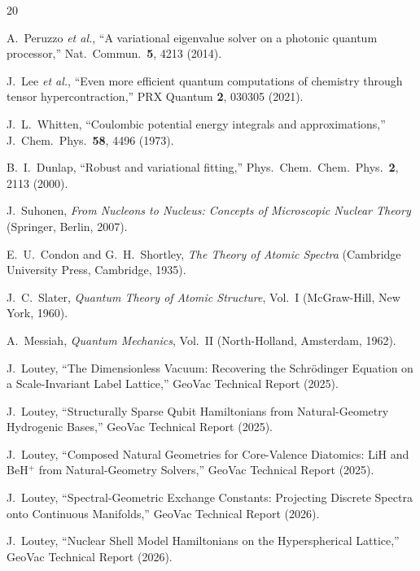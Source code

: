\documentclass[twocolumn,pra,amsmath,amssymb,superscriptaddress]{revtex4-2}
\begin{document}
\begin{thebibliography}{20}

A.~Peruzzo \textit{et al.},
``A variational eigenvalue solver on a photonic quantum processor,''
Nat.\ Commun.\ \textbf{5}, 4213 (2014).

J.~Lee \textit{et al.},
``Even more efficient quantum computations of chemistry through
tensor hypercontraction,''
PRX Quantum \textbf{2}, 030305 (2021).

J.~L.~Whitten,
``Coulombic potential energy integrals and approximations,''
J.\ Chem.\ Phys.\ \textbf{58}, 4496 (1973).

B.~I.~Dunlap,
``Robust and variational fitting,''
Phys.\ Chem.\ Chem.\ Phys.\ \textbf{2}, 2113 (2000).

J.~Suhonen,
\textit{From Nucleons to Nucleus: Concepts of Microscopic Nuclear Theory}
(Springer, Berlin, 2007).

E.~U.~Condon and G.~H.~Shortley,
\textit{The Theory of Atomic Spectra}
(Cambridge University Press, Cambridge, 1935).

J.~C.~Slater,
\textit{Quantum Theory of Atomic Structure}, Vol.~I
(McGraw-Hill, New York, 1960).

A.~Messiah,
\textit{Quantum Mechanics}, Vol.~II
(North-Holland, Amsterdam, 1962).

J.~Loutey,
``The Dimensionless Vacuum: Recovering the Schr\"odinger Equation
on a Scale-Invariant Label Lattice,''
GeoVac Technical Report (2025).

J.~Loutey,
``Structurally Sparse Qubit Hamiltonians from Natural-Geometry Hydrogenic Bases,''
GeoVac Technical Report (2025).

J.~Loutey,
``Composed Natural Geometries for Core-Valence Diatomics: LiH and
BeH$^+$ from Natural-Geometry Solvers,''
GeoVac Technical Report (2025).

J.~Loutey,
``Spectral-Geometric Exchange Constants: Projecting Discrete Spectra
onto Continuous Manifolds,''
GeoVac Technical Report (2026).

J.~Loutey,
``Nuclear Shell Model Hamiltonians on the Hyperspherical Lattice,''
GeoVac Technical Report (2026).


\end{thebibliography}
\end{document}
